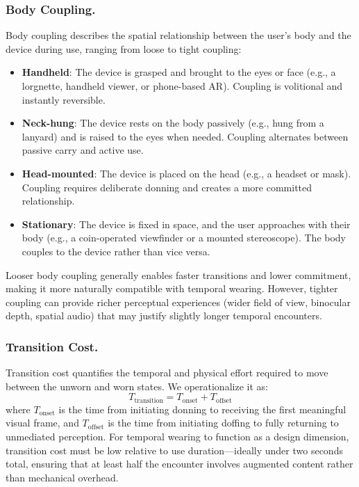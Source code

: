 \subsubsection{Body Coupling.}
Body coupling describes the spatial relationship between the user's body and the device during use, ranging from loose to tight coupling:
\begin{itemize}
    \item \textbf{Handheld}: The device is grasped and brought to the eyes or face (e.g., a lorgnette, handheld viewer, or phone-based AR). Coupling is volitional and instantly reversible.
    \item \textbf{Neck-hung}: The device rests on the body passively (e.g., hung from a lanyard) and is raised to the eyes when needed. Coupling alternates between passive carry and active use.
    \item \textbf{Head-mounted}: The device is placed on the head (e.g., a headset or mask). Coupling requires deliberate donning and creates a more committed relationship.
    \item \textbf{Stationary}: The device is fixed in space, and the user approaches with their body (e.g., a coin-operated viewfinder or a mounted stereoscope). The body couples to the device rather than vice versa.
\end{itemize}

Looser body coupling generally enables faster transitions and lower commitment, making it more naturally compatible with temporal wearing. However, tighter coupling can provide richer perceptual experiences (wider field of view, binocular depth, spatial audio) that may justify slightly longer temporal encounters.

\subsubsection{Transition Cost.}
Transition cost quantifies the temporal and physical effort required to move between the unworn and worn states. We operationalize it as:
\begin{equation}
    T_{\text{transition}} = T_{\text{onset}} + T_{\text{offset}}
\end{equation}
where $T_{\text{onset}}$ is the time from initiating donning to receiving the first meaningful visual frame, and $T_{\text{offset}}$ is the time from initiating doffing to fully returning to unmediated perception. For temporal wearing to function as a design dimension, transition cost must be low relative to use duration---ideally under two seconds total, ensuring that at least half the encounter involves augmented content rather than mechanical overhead.

